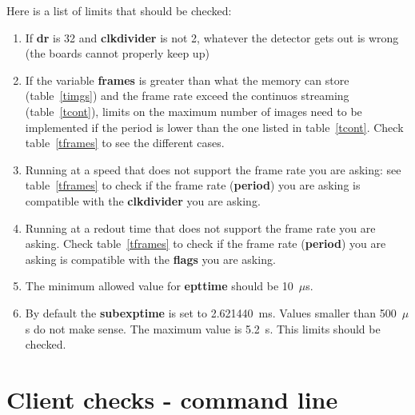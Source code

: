 \documentclass{article}
\begin{document}
Here is a list of limits that should be checked:
\begin{enumerate}
\item 
If \textbf{dr} is 32 and \textbf{clkdivider} is not 2, whatever the detector gets out is wrong (the boards cannot properly keep up) 
\item If the variable \textbf{frames} is greater than what the memory can store (table~\ref{timgs}) and the frame rate exceed the continuos streaming (table~\ref{tcont}), limits on the maximum number of images need to be implemented if the period is lower than the one listed in table~\ref{tcont}. Check table~\ref{tframes} to see the different cases.
\item Running at a speed that does not support the frame rate you are asking: see table~\ref{tframes} to check if the frame rate (\textbf{period}) you are asking is compatible with the \textbf{clkdivider} you are asking.
\item Running at a redout time that does not support the frame rate you are asking. Check table~\ref{tframes} to check if the frame rate (\textbf{period}) you are asking is compatible with the \textbf{flags} you are asking.
\item The minimum allowed value for \textbf{epttime} should be 10~$\mu$s. 
\item By default the {\textbf{subexptime}} is set to 2.621440~ms. Values smaller than 500~$\mu$s do not make sense. The maximum value is 5.2~s. This limits should be checked.
\end{enumerate}

\section{Client checks - command line}
\end{document}
